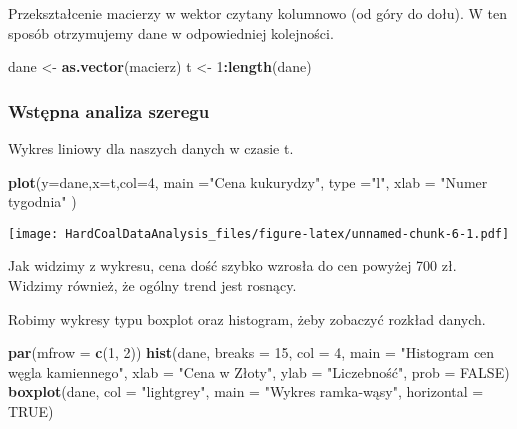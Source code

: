 \documentclass[
]{article}
\newenvironment{Shaded}{\begin{snugshade}}{\end{snugshade}}
\newcommand{\AttributeTok}[1]{\textcolor[rgb]{0.13,0.29,0.53}{#1}}
\newcommand{\ConstantTok}[1]{\textcolor[rgb]{0.56,0.35,0.01}{#1}}
\newcommand{\DecValTok}[1]{\textcolor[rgb]{0.00,0.00,0.81}{#1}}
\newcommand{\FunctionTok}[1]{\textcolor[rgb]{0.13,0.29,0.53}{\textbf{#1}}}
\newcommand{\NormalTok}[1]{#1}
\newcommand{\OtherTok}[1]{\textcolor[rgb]{0.56,0.35,0.01}{#1}}
\newcommand{\SpecialCharTok}[1]{\textcolor[rgb]{0.81,0.36,0.00}{\textbf{#1}}}
\newcommand{\StringTok}[1]{\textcolor[rgb]{0.31,0.60,0.02}{#1}}
\begin{document}
Przekształcenie macierzy w wektor czytany kolumnowo (od góry do dołu). W
ten sposób otrzymujemy dane w odpowiedniej kolejności.

\begin{Shaded}
\begin{Highlighting}[]
\NormalTok{dane }\OtherTok{\textless{}{-}} \FunctionTok{as.vector}\NormalTok{(macierz)}
\NormalTok{t }\OtherTok{\textless{}{-}} \DecValTok{1}\SpecialCharTok{:}\FunctionTok{length}\NormalTok{(dane)}
\end{Highlighting}
\end{Shaded}

\subsubsection{Wstępna analiza
szeregu}\label{wstux119pna-analiza-szeregu}

Wykres liniowy dla naszych danych w czasie t.

\begin{Shaded}
\begin{Highlighting}[]
\FunctionTok{plot}\NormalTok{(}\AttributeTok{y=}\NormalTok{dane,}\AttributeTok{x=}\NormalTok{t,}\AttributeTok{col=}\DecValTok{4}\NormalTok{, }\AttributeTok{main =}\StringTok{"Cena kukurydzy"}\NormalTok{, }\AttributeTok{type =}\StringTok{"l"}\NormalTok{, }\AttributeTok{xlab =} \StringTok{"Numer tygodnia"}\NormalTok{ )}
\end{Highlighting}
\end{Shaded}

\texttt{[image: HardCoalDataAnalysis\_files/figure-latex/unnamed-chunk-6-1.pdf]}

Jak widzimy z wykresu, cena dość szybko wzrosła do cen powyżej 700 zł.
Widzimy również, że ogólny trend jest rosnący.

Robimy wykresy typu boxplot oraz histogram, żeby zobaczyć rozkład
danych.

\begin{Shaded}
\begin{Highlighting}[]
\FunctionTok{par}\NormalTok{(}\AttributeTok{mfrow =} \FunctionTok{c}\NormalTok{(}\DecValTok{1}\NormalTok{, }\DecValTok{2}\NormalTok{)) }
\FunctionTok{hist}\NormalTok{(dane, }\AttributeTok{breaks =} \DecValTok{15}\NormalTok{, }\AttributeTok{col =} \DecValTok{4}\NormalTok{, }\AttributeTok{main =} \StringTok{"Histogram cen węgla kamiennego"}\NormalTok{,}
     \AttributeTok{xlab =} \StringTok{"Cena w Złoty"}\NormalTok{, }\AttributeTok{ylab =} \StringTok{"Liczebność"}\NormalTok{, }\AttributeTok{prob =} \ConstantTok{FALSE}\NormalTok{)}
\FunctionTok{boxplot}\NormalTok{(dane, }\AttributeTok{col =} \StringTok{"lightgrey"}\NormalTok{, }\AttributeTok{main =} \StringTok{"Wykres ramka{-}wąsy"}\NormalTok{, }\AttributeTok{horizontal =} \ConstantTok{TRUE}\NormalTok{)}
\end{Highlighting}
\end{Shaded}
\end{document}
